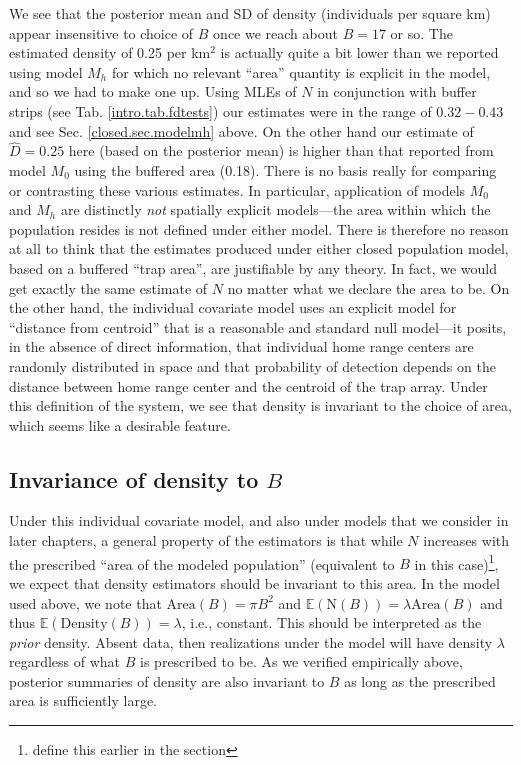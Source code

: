 We see that the posterior mean and SD of density (individuals per
square km) appear insensitive to choice of $B$ once we reach about
$B=17$ or so.
The estimated density of
0.25 per km$^2$ is actually quite a bit lower than we reported using
model $M_h$ for which no relevant ``area'' quantity is explicit in the
model, and so we had to make one up.  Using MLEs of $N$ in conjunction with buffer strips (see Tab.
\ref{intro.tab.fdtests}) our estimates were in the range of
$0.32-0.43$ and see Sec.  \ref{closed.sec.modelmh} above.  On the
other hand our estimate of $\hat{D} = 0.25$ here (based on the
posterior mean) is higher than that reported from model $M_0$ using
the buffered area (0.18). There is no basis really for comparing or
contrasting these various estimates.
In
particular, application of models $M_0$ and $M_h$ are distinctly {\it
  not} spatially explicit models---the area within which the
population resides is not defined under either model. There is
therefore no reason at all to think that the estimates produced under
either closed population model, based on a buffered ``trap area'', are
justifiable by any theory. In fact, we would get exactly the same
estimate of $N$ no matter what we declare the area to be. On the other
hand, the individual covariate model uses an explicit model for 
 ``distance from centroid'' that is a reasonable and
standard null model---it posits, in the absence of direct information,
that individual home range centers are randomly distributed in space
and that probability of detection depends on the distance between home
range center and the centroid of the trap array. Under this definition
of the system, we see that density is invariant to the choice of area,
which seems like a desirable feature.


\subsection{Invariance of density to $B$}

Under this individual covariate model, and also under models that we
consider in later chapters, a general property of the estimators is
that while $N$ increases with the prescribed ``area of the modeled
population'' (equivalent to $B$ in this case)\footnote{define this
  earlier in the section}, we expect that density estimators should be
invariant to this area. In the model used above, we note that
$\mbox{Area}(B) = \pi B^{2}$ and $\mathbb{E}(\mbox{N}(B)) = \lambda
\mbox{Area}(B)$ and thus $\mathbb{E}(\mbox{Density}(B)) = \lambda$,
i.e., constant. This should be interpreted as the {\it prior}
density. Absent data, then realizations under the model will have
density $\lambda$ regardless of what $B$ is prescribed to be.  As we
verified empirically above,  posterior summaries of density are also invariant to
$B$ as long as the prescribed area is sufficiently large.

